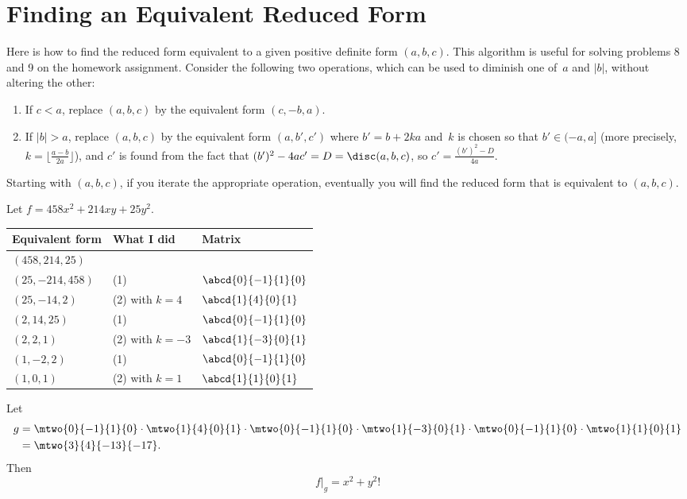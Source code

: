 \documentclass[11pt]{report}
\begin{document}
\section{Finding an Equivalent Reduced Form}
Here is how to find the reduced form equivalent
to a given positive definite form $(a,b,c)$.
This algorithm is useful for solving problems 8 and 9 on
the homework assignment.
Consider the following two operations, which can be used to diminish
one of~$a$ and $|b|$, without altering the other:
\begin{enumerate}
  \item
        If $c<a$, replace $(a,b,c)$ by the equivalent form
        $(c,-b,a)$.

  \item
        If $|b|>a$, replace $(a,b,c)$ by the equivalent form
        $(a,b',c')$ where $b'=b+2ka$ and~$k$ is chosen so that
        $b'\in(-a,a]$ (more precisely, $k=\lfloor \frac{a-b}{2a}\rfloor$),
        and $c'$ is found from the fact that
        $(b')^2 - 4ac'=D=\disc(a,b,c)$, so
        $c' = \frac{(b')^2 - D}{4a}$.
\end{enumerate}
Starting with $(a,b,c)$, if you iterate the appropriate operation,
eventually you will find the reduced form that is equivalent to
$(a,b,c)$.


\begin{example}
  Let $f=458x^2 + 214xy + 25y^2$.
  \begin{center}
    \begin{tabular}{|l|l|l|}\hline
      Equivalent form & What I did      & Matrix               \\\hline
      $(458,214,25)$  &                 &                      \\\hline
      $(25,-214,458)$ & (1)             & $\abcd{0}{-1}{1}{0}$ \\\hline
      $(25,-14,2)$    & (2) with $k=4$  & $\abcd{1}{4}{0}{1}$  \\\hline
      $(2,14,25)$     & (1)             & $\abcd{0}{-1}{1}{0}$ \\\hline
      $(2,2,1)$       & (2) with $k=-3$ & $\abcd{1}{-3}{0}{1}$ \\\hline
      $(1,-2,2)$      & (1)             & $\abcd{0}{-1}{1}{0}$ \\\hline
      $(1,0,1)$       & (2) with $k=1$  & $\abcd{1}{1}{0}{1}$  \\\hline
    \end{tabular}
  \end{center}

  Let
  \begin{align*}
    g & = \mtwo{0}{-1}{1}{0}\cdot \mtwo{1}{4}{0}{1}\cdot
    \mtwo{0}{-1}{1}{0}\cdot \mtwo{1}{-3}{0}{1}\cdot
    \mtwo{0}{-1}{1}{0}\cdot \mtwo{1}{1}{0}{1}            \\
      & = \mtwo{\hfill3}{\hfill4}{-13}{-17}.
  \end{align*}
  Then
  $$f|_g = x^2 + y^2!$$
\end{example}
\end{document}
